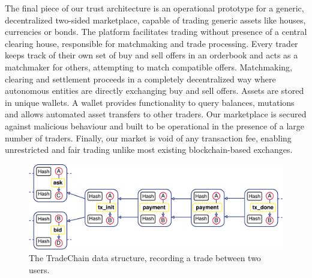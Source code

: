 \documentclass[USenglish]{article}
\begin{document}
The final piece of our trust architecture is an operational prototype for a generic, decentralized two-sided marketplace, capable of trading generic assets like houses, currencies or bonds.
The platform facilitates trading without presence of a central clearing house, responsible for matchmaking and trade processing.
Every trader keeps track of their own set of buy and sell offers in an orderbook and acts as a matchmaker for others, attempting to match compatible offers.
Matchmaking, clearing and settlement proceeds in a completely decentralized way where autonomous entities are directly exchanging buy and sell offers.
Assets are stored in unique wallets.
A wallet provides functionality to query balances, mutations and allows automated asset transfers to other traders.
Our marketplace is secured against malicious behaviour and built to be operational in the presence of a large number of traders.
Finally, our market is void of any transaction fee, enabling unrestricted and fair trading unlike most existing blockchain-based exchanges.

\begin{figure}[t]
	\centering
	\includegraphics[width=1\columnwidth]{assets/tradechain}
	\caption{The TradeChain data structure, recording a trade between two users.}
	\label{fig:tradechain}
\end{figure}
\end{document}
